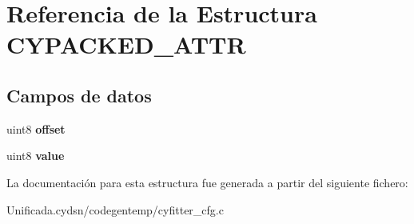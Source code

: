 \hypertarget{struct_c_y_p_a_c_k_e_d___a_t_t_r}{}\section{Referencia de la Estructura C\+Y\+P\+A\+C\+K\+E\+D\+\_\+\+A\+T\+TR}
\label{struct_c_y_p_a_c_k_e_d___a_t_t_r}
\subsection*{Campos de datos}
\begin{DoxyCompactItemize}
\item 
\mbox{\label{struct_c_y_p_a_c_k_e_d___a_t_t_r_af2f806089451be6269e0b22880d71e6e}} 
uint8 {\bfseries offset}
\item 
\mbox{\label{struct_c_y_p_a_c_k_e_d___a_t_t_r_ab0691bf8f97b00f4f65387b993efa4d9}} 
uint8 {\bfseries value}
\end{DoxyCompactItemize}


La documentación para esta estructura fue generada a partir del siguiente fichero\+:\begin{DoxyCompactItemize}
\item 
Unificada.\+cydsn/codegentemp/cyfitter\+\_\+cfg.\+c\end{DoxyCompactItemize}
